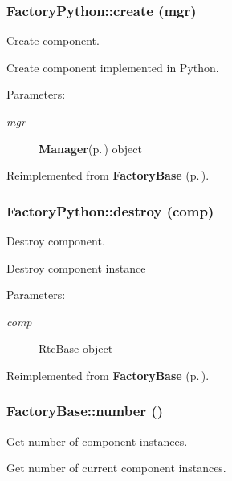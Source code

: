 \subsubsection{\setlength{\rightskip}{0pt plus 5cm}Factory\-Python::create (mgr)}\label{classFactoryPython_FactoryPythona1}


Create component. 

Create component implemented in Python. \begin{Desc}
\item[Parameters:]
\begin{description}
\item[{\em mgr}]{\bf Manager}{\rm (p.\,\pageref{classManager})} object\end{description}
\end{Desc}


Reimplemented from {\bf Factory\-Base} {\rm (p.\,\pageref{classFactoryBase_FactoryBasea2})}.
\subsubsection{\setlength{\rightskip}{0pt plus 5cm}Factory\-Python::destroy (comp)}\label{classFactoryPython_FactoryPythona2}


Destroy component. 

Destroy component instance \begin{Desc}
\item[Parameters:]
\begin{description}
\item[{\em comp}]Rtc\-Base object\end{description}
\end{Desc}


Reimplemented from {\bf Factory\-Base} {\rm (p.\,\pageref{classFactoryBase_FactoryBasea3})}.
\subsubsection{\setlength{\rightskip}{0pt plus 5cm}Factory\-Base::number ()\hspace{0.3cm}{\tt  [inherited]}}\label{classFactoryBase_FactoryPythona6}


Get number of component instances. 

Get number of current component instances.
